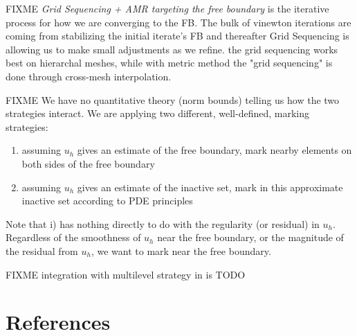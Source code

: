 \documentclass[]{interact}
\theoremstyle{plain}%
\theoremstyle{definition}
\theoremstyle{remark}
\begin{document}
FIXME \emph{Grid Sequencing + AMR targeting the free boundary} is the iterative process for how we are converging to the FB.  The bulk of vinewton iterations are coming from stabilizing the initial iterate's FB and thereafter Grid Sequencing is allowing us to make small adjustments as we refine.  the grid sequencing works best on hierarchal meshes, while with metric method the "grid sequencing" is done through cross-mesh interpolation.

FIXME We have no quantitative theory (norm bounds) telling us how the two strategies interact.  We are applying two different, well-defined, marking strategies:
\begin{enumerate}
\item assuming $u_h$ gives an estimate of the free boundary, mark nearby elements on both sides of the free boundary
\item assuming $u_h$ gives an estimate of the inactive set, mark in this approximate inactive set according to PDE principles
\end{enumerate}
Note that i) has nothing directly to do with the regularity (or residual) in $u_h$.  Regardless of the smoothness of $u_h$ near the free boundary, or the magnitude of the residual from $u_h$, we want to mark near the free boundary.

FIXME integration with multilevel strategy in \cite{BuelerFarrell2024} is TODO




\section{References}





\end{document}
